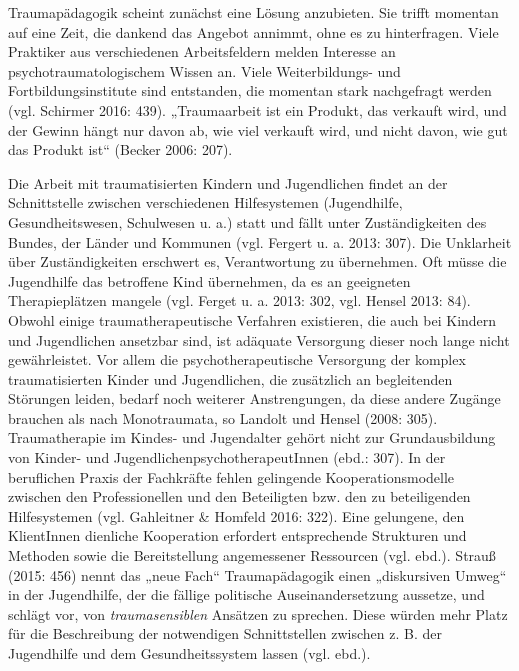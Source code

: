 Traumapädagogik scheint zunächst eine Lösung anzubieten. Sie trifft momentan auf eine Zeit, die dankend das Angebot annimmt, ohne es zu hinterfragen. Viele Praktiker aus verschiedenen Arbeitsfeldern melden Interesse an psychotraumatologischem Wissen an. Viele Weiterbildungs- und Fortbildungsinstitute sind entstanden, die momentan stark nachgefragt werden (vgl. Schirmer 2016: 439). „Traumaarbeit ist ein Produkt, das verkauft wird, und der Gewinn hängt nur davon ab, wie viel verkauft wird, und nicht davon, wie gut das Produkt ist“ (Becker 2006: 207).

Die Arbeit mit traumatisierten Kindern und Jugendlichen findet an der Schnittstelle zwischen verschiedenen Hilfesystemen (Jugendhilfe, Gesundheitswesen, Schulwesen u. a.) statt und fällt unter Zuständigkeiten des Bundes, der Länder und Kommunen (vgl. Fergert u. a. 2013: 307). Die Unklarheit über Zuständigkeiten erschwert es, Verantwortung zu übernehmen. Oft müsse die Jugendhilfe das betroffene Kind übernehmen, da es an geeigneten Therapieplätzen mangele (vgl. Ferget u. a. 2013: 302, vgl. Hensel 2013: 84). Obwohl einige traumatherapeutische Verfahren existieren, die auch bei Kindern und Jugendlichen ansetzbar sind, ist adäquate Versorgung dieser noch lange nicht gewährleistet. Vor allem die psychotherapeutische Versorgung der komplex traumatisierten Kinder und Jugendlichen, die zusätzlich an begleitenden Störungen leiden, bedarf noch weiterer Anstrengungen, da diese andere Zugänge brauchen als nach Monotraumata, so Landolt und Hensel (2008: 305). Traumatherapie im Kindes- und Jugendalter gehört nicht zur Grundausbildung von Kinder- und JugendlichenpsychotherapeutInnen (ebd.: 307). In der beruflichen Praxis der Fachkräfte fehlen gelingende Kooperationsmodelle zwischen den Professionellen und den Beteiligten bzw. den zu beteiligenden Hilfesystemen (vgl. Gahleitner \& Homfeld 2016: 322). Eine gelungene, den KlientInnen dienliche Kooperation erfordert entsprechende Strukturen und Methoden sowie die Bereitstellung angemessener Ressourcen (vgl. ebd.). Strauß (2015: 456) nennt das „neue Fach“ Traumapädagogik einen „diskursiven Umweg“ in der Jugendhilfe, der die fällige politische Auseinandersetzung aussetze, und schlägt vor, von \textit{traumasensiblen} Ansätzen zu sprechen. Diese würden mehr Platz für die Beschreibung der notwendigen Schnittstellen zwischen z. B. der Jugendhilfe und dem Gesundheitssystem lassen (vgl. ebd.).

